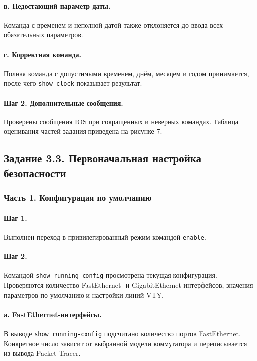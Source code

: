 \documentclass[a4paper,14pt,oneside]{extarticle}
\begin{document}
\paragraph{в. Недостающий параметр даты.}
Команда с временем и неполной датой также отклоняется до ввода всех
обязательных параметров.

\paragraph{г. Корректная команда.}
Полная команда с допустимыми временем, днём, месяцем и годом принимается,
после чего \texttt{show clock} показывает результат.

\paragraph{Шаг 2. Дополнительные сообщения.}
Проверены сообщения IOS при сокращённых и неверных командах. Таблица
оценивания частей задания приведена на рисунке 7.

\subsection{Задание 3.3. Первоначальная настройка безопасности}

\subsubsection{Часть 1. Конфигурация по умолчанию}

\paragraph{Шаг 1.}
Выполнен переход в привилегированный режим командой \texttt{enable}.

\paragraph{Шаг 2.}
Командой \texttt{show running-config} просмотрена текущая конфигурация.
Проверяются количество FastEthernet- и GigabitEthernet-интерфейсов, значения
параметров по умолчанию и настройки линий VTY.

\paragraph{а. FastEthernet-интерфейсы.}
В выводе \texttt{show running-config} подсчитано количество портов
FastEthernet. Конкретное число зависит от выбранной модели коммутатора и
переписывается из вывода Packet Tracer.
\end{document}
